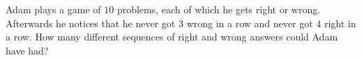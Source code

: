 Adam plays a game of $10$ problems, each of which he gets right or wrong. Afterwards he notices that he never got $3$ wrong in a row and never got $4$ right in a row. How many different sequences of right and wrong answers could Adam have had?
